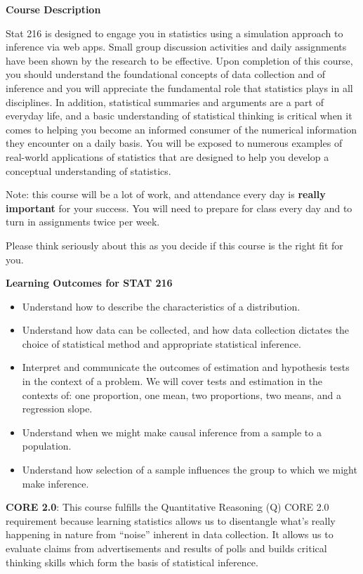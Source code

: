  
{\bf Course Description }
 
Stat 216 is designed to engage you in statistics using a 
simulation approach to inference via web apps. Small group
discussion activities and daily assignments have been shown by the
research to be effective. Upon completion of this
course, you should  understand the foundational concepts
of data collection and of inference and you will appreciate the
fundamental role that statistics plays in all disciplines.  In
addition, statistical summaries and arguments are a part of everyday
life, and a basic understanding of statistical thinking is critical
when it comes to helping you become an informed consumer of the
numerical information they encounter on a daily basis.   You will be
exposed to numerous examples of real-world applications of statistics
that are designed to help you develop a conceptual understanding of
statistics.     
 
Note: this course will be a lot of work, and attendance every day is
{\bf really important} for your success. You will need to prepare for class
every day and to turn in assignments twice per week.

Please think seriously about this as you decide if this course is the
right fit for you.    

   \begin{center}
     {\bf Learning Outcomes for STAT 216 }
   \end{center}
   \begin{itemize}
   \item Understand how to describe the characteristics of a distribution.
   \item Understand how data can be collected, and how data collection
     dictates the choice of statistical method and appropriate
     statistical inference.
   \item Interpret and communicate the outcomes of estimation and
     hypothesis tests in the context of a problem. We will cover tests
     and estimation in the contexts of: one proportion, one mean, two
     proportions, two means, and a regression slope.   
   \item Understand when we might make causal inference from a
     sample to a population.
   \item Understand how selection of a sample influences the
     group to which we might make inference.
   \end{itemize}
    

{\bf CORE 2.0}:  This course fulfills the Quantitative Reasoning (Q)
CORE 2.0 requirement because learning statistics allows us to
disentangle what's really happening in nature from ``noise'' inherent in
data collection. It allows us to evaluate claims from advertisements
and results of polls and builds critical thinking skills which form
the basis of statistical inference.   

